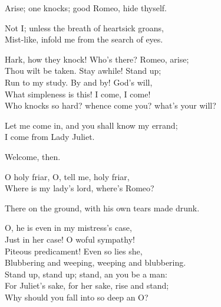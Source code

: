 \begin{speech}
Arise; one knocks; good Romeo, hide thyself. \\

\end{speech}
\begin{speech}
Not I; unless the breath of heartsick groans, \\
Mist-like, infold me from the search of eyes. 
\\
\end{speech}
\begin{speech}
Hark, how they knock!   Who's there? Romeo, arise;
\\
Thou wilt be taken. Stay awhile! Stand up; 
\\
Run to my study. By and by! God's will, \\
What simpleness is this!   I come, I come! 
\\
Who knocks so hard? whence come you? what's your will? \\
\end{speech}
\begin{speech}
 Let me come in, and you shall know my errand;
\\
I come from Lady Juliet. \\
\end{speech}
\begin{speech}
Welcome, then.  \\
\end{speech}
\begin{speech}
O holy friar, O, tell me, holy friar, \\
Where is my lady's lord, where's Romeo? \\
\end{speech}
\begin{speech}
There on the ground, with his own tears made drunk.
\\
\end{speech}
\begin{speech}
O, he is even in my mistress's case, \\
Just in her case!   O woful sympathy! \\
Piteous predicament!   Even so lies she, \\
Blubbering and weeping, weeping and blubbering. \\
Stand up, stand up; stand, an you be a man: \\
For Juliet's sake, for her sake, rise and stand; \\
Why should you fall into so deep an O? \\
\end{speech}
